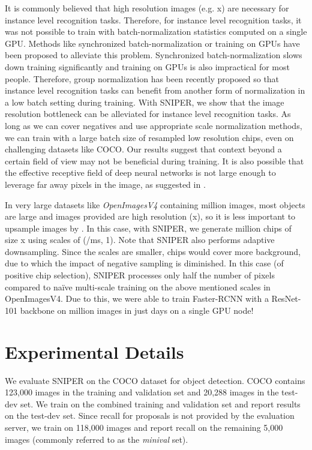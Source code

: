 \documentclass{article}
\begin{document}
It is commonly believed that high resolution images (e.g. x) are necessary for instance level recognition tasks. Therefore, for instance level recognition tasks, it was not possible to train with batch-normalization statistics computed on a single GPU. Methods like synchronized batch-normalization \cite{liu2018path,zhao2017pyramid} or training on  GPUs \cite{peng2017megdet} have been proposed to alleviate this problem. Synchronized batch-normalization slows down training significantly and training on  GPUs is also impractical for most people. Therefore, group normalization \cite{GroupNorm2018} has been recently proposed so that instance level recognition tasks can benefit from another form of normalization in a low batch setting during training. With SNIPER, we show that the image resolution bottleneck can be alleviated for instance level recognition tasks. As long as we can cover negatives and use appropriate scale normalization methods, we can train with a large batch size of resampled low resolution chips, even on challenging datasets like COCO. Our results suggest that context beyond a certain field of view may not be beneficial during training. It is also possible that the effective receptive field of deep neural networks is not large enough to leverage far away pixels in the image, as suggested in \cite{luo2016understanding}.

In very large datasets like \textit{OpenImagesV4} \cite{openimages} containing  million images, most objects are large and images provided are high resolution (x), so it is less important to upsample images by . In this case, with SNIPER, we generate  million chips of size x using scales of (/ms, 1). Note that SNIPER also performs adaptive downsampling. Since the scales are smaller, chips would cover more background, due to which the impact of negative sampling is diminished. In this case (of positive chip selection), SNIPER processes only half the number of pixels compared to na\"ive multi-scale training on the above mentioned scales in OpenImagesV4. Due to this, we were able to train Faster-RCNN with a ResNet-101 backbone on  million images in just  days on a single  GPU node!

\section{Experimental Details}
\label{sec:exp_details}
We evaluate SNIPER on the COCO dataset for object detection. COCO contains 123,000 images in the training and validation set and  20,288 images in the test-dev set. We train on the combined training and validation set and report results on the test-dev set. Since recall for proposals is not provided by the evaluation server, we train on 118,000 images and report recall on the remaining 5,000 images (commonly referred to as the \textit{minival} set). 
\end{document}
